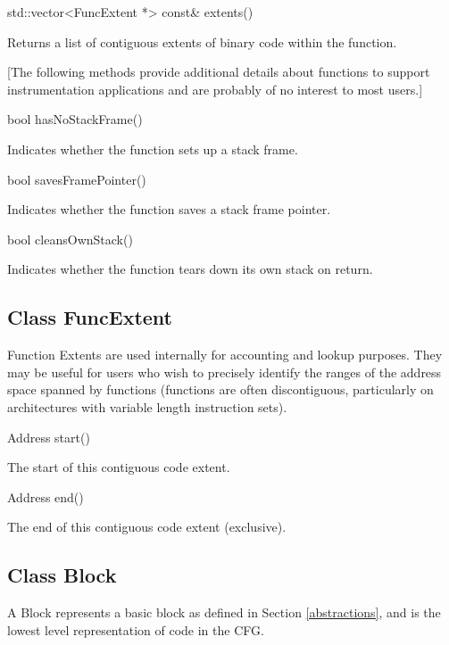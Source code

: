 \documentclass{article}
\newenvironment{apient}{\small\verbatim}{\endverbatim}
\newcommand{\apidesc}[1]{%
{\addtolength{\leftskip}{4em}%
#1\par\medskip}
}
\begin{document}
\begin{apient}
std::vector<FuncExtent *> const& extents()
\end{apient}
\apidesc{Returns a list of contiguous extents of binary code within the function.}

[The following methods provide additional details about functions to support instrumentation applications and are probably of no interest to most users.]

\begin{apient}
bool hasNoStackFrame()
\end{apient}
\apidesc{Indicates whether the function sets up a stack frame.}

\begin{apient}
bool savesFramePointer()
\end{apient}
\apidesc{Indicates whether the function saves a stack frame pointer.}

\begin{apient}
bool cleansOwnStack()
\end{apient}
\apidesc{Indicates whether the function tears down its own stack on return.}

\subsection{Class FuncExtent}

Function Extents are used internally for accounting and lookup purposes. They may be useful for users who wish to precisely identify the ranges of the address space spanned by functions (functions are often discontiguous, particularly on architectures with variable length instruction sets).

\begin{apient}
Address start()
\end{apient}
\apidesc{The start of this contiguous code extent.}

\begin{apient}
Address end()
\end{apient}
\apidesc{The end of this contiguous code extent (exclusive).}

\subsection{Class Block}

A Block represents a basic block as defined in Section \ref{abstractions}, and is the lowest level representation of code in the CFG.
\end{document}
